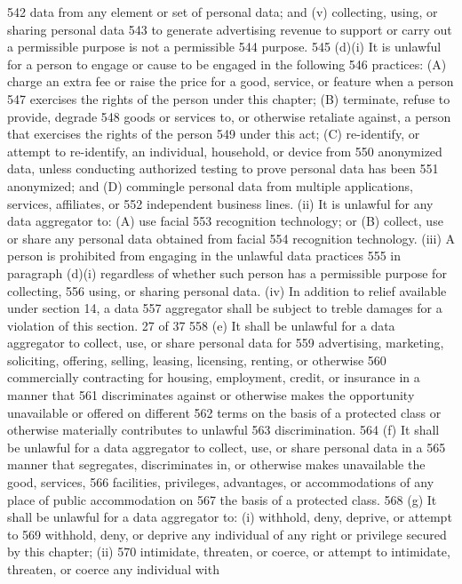 542 data from any element or set of personal data; and (v) collecting, using, or sharing personal data
543 to generate advertising revenue to support or carry out a permissible purpose is not a permissible
544 purpose.
545 (d)(i) It is unlawful for a person to engage or cause to be engaged in the following
546 practices: (A) charge an extra fee or raise the price for a good, service, or feature when a person
547 exercises the rights of the person under this chapter; (B) terminate, refuse to provide, degrade
548 goods or services to, or otherwise retaliate against, a person that exercises the rights of the person
549 under this act; (C) re-identify, or attempt to re-identify, an individual, household, or device from
550 anonymized data, unless conducting authorized testing to prove personal data has been
551 anonymized; and (D) commingle personal data from multiple applications, services, affiliates, or
552 independent business lines. (ii) It is unlawful for any data aggregator to: (A) use facial
553 recognition technology; or (B) collect, use or share any personal data obtained from facial
554 recognition technology. (iii) A person is prohibited from engaging in the unlawful data practices
555 in paragraph (d)(i) regardless of whether such person has a permissible purpose for collecting,
556 using, or sharing personal data. (iv) In addition to relief available under section 14, a data
557 aggregator shall be subject to treble damages for a violation of this section.
27 of 37
558 (e) It shall be unlawful for a data aggregator to collect, use, or share personal data for
559 advertising, marketing, soliciting, offering, selling, leasing, licensing, renting, or otherwise
560 commercially contracting for housing, employment, credit, or insurance in a manner that
561 discriminates against or otherwise makes the opportunity unavailable or offered on different
562 terms on the basis of a protected class or otherwise materially contributes to unlawful
563 discrimination.
564 (f) It shall be unlawful for a data aggregator to collect, use, or share personal data in a
565 manner that segregates, discriminates in, or otherwise makes unavailable the good, services,
566 facilities, privileges, advantages, or accommodations of any place of public accommodation on
567 the basis of a protected class.
568 (g) It shall be unlawful for a data aggregator to: (i) withhold, deny, deprive, or attempt to
569 withhold, deny, or deprive any individual of any right or privilege secured by this chapter; (ii)
570 intimidate, threaten, or coerce, or attempt to intimidate, threaten, or coerce any individual with
